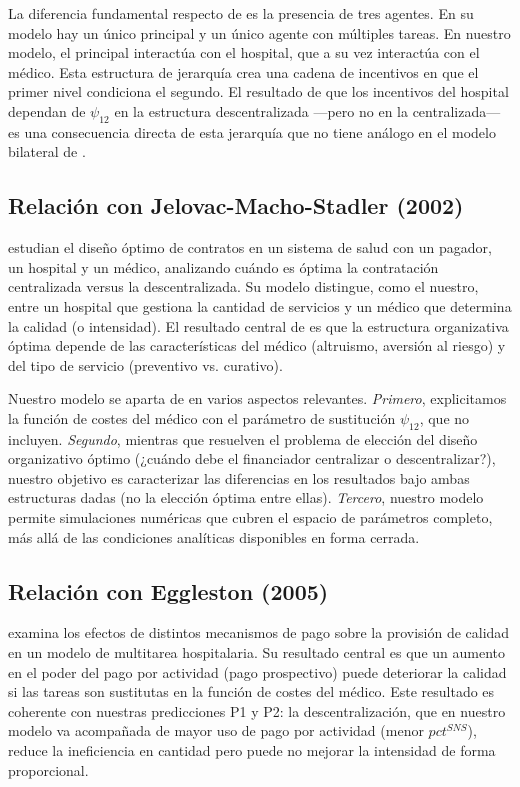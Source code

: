 La diferencia fundamental respecto de \citet{holmstrom1991} es la presencia de tres agentes. En su modelo hay un único principal y un único agente con múltiples tareas. En nuestro modelo, el principal interactúa con el hospital, que a su vez interactúa con el médico. Esta estructura de jerarquía crea una cadena de incentivos en que el primer nivel condiciona el segundo. El resultado de que los incentivos del hospital dependan de $\psi_{12}$ en la estructura descentralizada ---pero no en la centralizada--- es una consecuencia directa de esta jerarquía que no tiene análogo en el modelo bilateral de \citet{holmstrom1991}.

\subsection{Relación con Jelovac-Macho-Stadler (2002)}

\citet{jelovac2002} estudian el diseño óptimo de contratos en un sistema de salud con un pagador, un hospital y un médico, analizando cuándo es óptima la contratación centralizada versus la descentralizada. Su modelo distingue, como el nuestro, entre un hospital que gestiona la cantidad de servicios y un médico que determina la calidad (o intensidad). El resultado central de \citet{jelovac2002} es que la estructura organizativa óptima depende de las características del médico (altruismo, aversión al riesgo) y del tipo de servicio (preventivo vs. curativo).

Nuestro modelo se aparta de \citet{jelovac2002} en varios aspectos relevantes. \textit{Primero}, explicitamos la función de costes del médico con el parámetro de sustitución $\psi_{12}$, que \citet{jelovac2002} no incluyen. \textit{Segundo}, mientras que \citet{jelovac2002} resuelven el problema de elección del diseño organizativo óptimo (¿cuándo debe el financiador centralizar o descentralizar?), nuestro objetivo es caracterizar las diferencias en los resultados bajo ambas estructuras dadas (no la elección óptima entre ellas). \textit{Tercero}, nuestro modelo permite simulaciones numéricas que cubren el espacio de parámetros completo, más allá de las condiciones analíticas disponibles en forma cerrada.

\subsection{Relación con Eggleston (2005)}

\citet{eggleston2005} examina los efectos de distintos mecanismos de pago sobre la provisión de calidad en un modelo de multitarea hospitalaria. Su resultado central es que un aumento en el poder del pago por actividad (pago prospectivo) puede deteriorar la calidad si las tareas son sustitutas en la función de costes del médico. Este resultado es coherente con nuestras predicciones P1 y P2: la descentralización, que en nuestro modelo va acompañada de mayor uso de pago por actividad (menor $pct^{SNS}$), reduce la ineficiencia en cantidad pero puede no mejorar la intensidad de forma proporcional.

